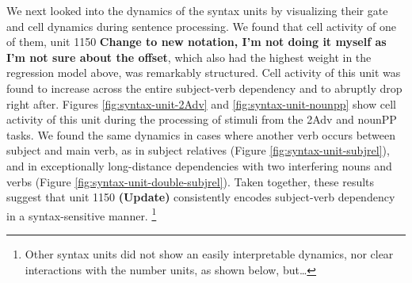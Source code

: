 We next looked into the dynamics of the syntax units by visualizing
their gate and cell dynamics during sentence processing. We found that
cell activity of one of them, unit 1150 \textbf{Change to new
  notation, I'm not doing it myself as I'm not sure about the offset},
which also had the highest weight in the regression model above, was
remarkably structured. Cell activity of this unit was found to
increase across the entire subject-verb dependency and to abruptly
drop right after. Figures \ref{fig:syntax-unit-2Adv} and
\ref{fig:syntax-unit-nounpp} show cell activity of this unit during
the processing of stimuli from the 2Adv and nounPP tasks. We found the
same dynamics in cases where another verb occurs between subject and
main verb, as in subject relatives (Figure
\ref{fig:syntax-unit-subjrel}), and in exceptionally long-distance
dependencies with two interfering nouns and verbs (Figure
\ref{fig:syntax-unit-double-subjrel}). Taken together, these results
suggest that unit 1150 \textbf{(Update)} consistently encodes
subject-verb dependency in a syntax-sensitive manner. 
\footnote{Other syntax units did not show an easily interpretable
  dynamics, nor clear interactions with the number units, as shown below, but\ldots}


